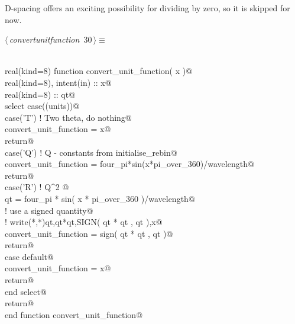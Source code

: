 \documentclass[10pt,a4paper,notitlepage]{article}
\begin{document}
D-spacing offers
an exciting possibility for dividing by zero, so it is skipped for now.

\begin{flushleft} \small
\begin{minipage}{\linewidth}\label{scrap34}\raggedright\small
{} $\langle\,${\it convertunitfunction}\nobreak\ {\footnotesize {30}}$\,\rangle\equiv$
\vspace{-1ex}
\begin{list}{}{} \item
\mbox{}\verb@@\\
\mbox{}\verb@      real(kind=8) function convert_unit_function( x )@\\
\mbox{}\verb@      real(kind=8), intent(in) :: x@\\
\mbox{}\verb@      real(kind=8) :: qt@\\
\mbox{}\verb@      select case((units))@\\
\mbox{}\verb@        case('T') ! Two theta, do nothing@\\
\mbox{}\verb@           convert_unit_function = x@\\
\mbox{}\verb@           return@\\
\mbox{}\verb@        case('Q') ! Q - constants from initialise_rebin@\\
\mbox{}\verb@           convert_unit_function = four_pi*sin(x*pi_over_360)/wavelength@\\
\mbox{}\verb@           return@\\
\mbox{}\verb@        case('R') ! Q^2 @\\
\mbox{}\verb@           qt = four_pi * sin( x * pi_over_360 )/wavelength@\\
\mbox{}\verb@! use a signed quantity@\\
\mbox{}\verb@!        write(*,*)qt,qt*qt,SIGN( qt * qt , qt ),x@\\
\mbox{}\verb@           convert_unit_function = sign( qt * qt , qt )@\\
\mbox{}\verb@           return@\\
\mbox{}\verb@        case default@\\
\mbox{}\verb@           convert_unit_function = x@\\
\mbox{}\verb@           return@\\
\mbox{}\verb@      end select@\\
\mbox{}\verb@      return@\\
\mbox{}\verb@      end function convert_unit_function@\\

\end{list}
\end{minipage}
\end{flushleft}
\end{document}
